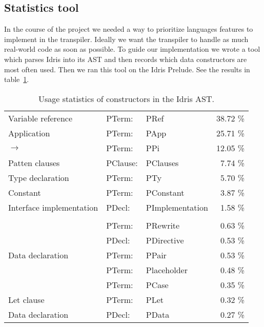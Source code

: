 \documentclass[parskip=half]{scrartcl}
\begin{document}
\subsection{Statistics tool}
In the course of the project we needed a way to prioritize languages features
to implement in the transpiler. Ideally we want the transpiler to handle
as much real-world code as soon as possible. To guide our implementation we
wrote a tool which parses Idris into its AST and then records which data
constructors are most often used. Then we ran this tool on the Idris Prelude.
See the results in table~\ref{tbl:stats}.


\begin{table}[h]
  \caption {Usage statistics of constructors in the Idris AST.}
  \label{tbl:stats}
\begin{center}
  \begin{tabular}{ l l l r }
    Variable reference       & PTerm:   &    PRef            &    38.72 \% \\
    Application              & PTerm:   &    PApp            &    25.71 \% \\
    $\rightarrow$            & PTerm:   &    PPi             &    12.05 \% \\
    Patten clauses           & PClause: &    PClauses        &    7.74  \% \\
    Type declaration         & PTerm:   &    PTy             &    5.70  \% \\
    Constant                 & PTerm:   &    PConstant       &    3.87  \% \\
    Interface implementation & PDecl:   &    PImplementation &    1.58  \% \\
    \\
                             & PTerm:   &    PRewrite        &    0.63  \% \\
                             & PDecl:   &    PDirective      &    0.53  \% \\
    Data declaration         & PTerm:   &    PPair           &    0.53  \% \\
                             & PTerm:   &    Placeholder     &    0.48  \% \\
                             & PTerm:   &    PCase           &    0.35  \% \\
    Let clause               & PTerm:   &    PLet            &    0.32  \% \\
    Data declaration         & PDecl:   &    PData           &    0.27  \% \\

\end{tabular}
\end{center}
\end{table}
\end{document}
